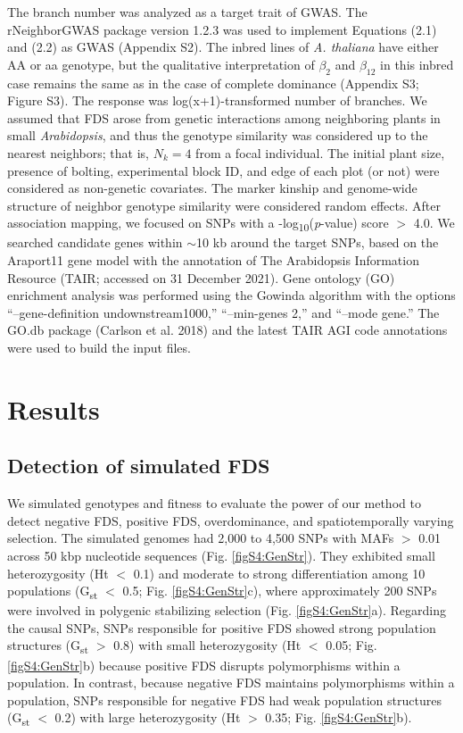 \documentclass[12pt,]{article}
\begin{document}
The branch number was analyzed as a target trait of GWAS. The rNeighborGWAS package version 1.2.3 \citep{sato2019neighbor} was used to implement Equations (2.1) and (2.2) as GWAS (Appendix S2). The inbred lines of \textit{A. thaliana} have either AA or aa genotype, but the qualitative interpretation of $\beta_2$ and $\beta_{12}$ in this inbred case remains the same as in the case of complete dominance (Appendix S3; Figure S3). The response was log(x+1)-transformed number of branches. We assumed that FDS arose from genetic interactions among neighboring plants in small \textit{Arabidopsis}, and thus the genotype similarity was considered up to the nearest neighbors; that is, $N_k=4$ from a focal individual. The initial plant size, presence of bolting, experimental block ID, and edge of each plot (or not) were considered as non-genetic covariates. The marker kinship and genome-wide structure of neighbor genotype similarity were considered random effects. After association mapping, we focused on SNPs with a -log\textsubscript{10}(\textit{p}-value) score $>$ 4.0. We searched candidate genes within $\sim$10 kb around the target SNPs, based on the Araport11 gene model with the annotation of The Arabidopsis Information Resource (TAIR; accessed on 31 December 2021). Gene ontology (GO) enrichment analysis was performed using the Gowinda algorithm \citep{kofler2012gowinda} with the options “--gene-definition undownstream1000,” “--min-genes 2,” and “--mode gene.” The GO.db package (Carlson et al. 2018) and the latest TAIR AGI code annotations were used to build the input files.


\section{Results}

\subsection{Detection of simulated FDS}
We simulated genotypes and fitness to evaluate the power of our method to detect negative FDS, positive FDS, overdominance, and spatiotemporally varying selection. The simulated genomes had 2,000 to 4,500 SNPs with MAFs $>$ 0.01 across 50 kbp nucleotide sequences (Fig. \ref{figS4:GenStr}). They exhibited small heterozygosity (Ht $<$ 0.1) and moderate to strong differentiation among 10 populations (G\textsubscript{st} $<$ 0.5; Fig. \ref{figS4:GenStr}c), where approximately 200 SNPs were involved in polygenic stabilizing selection (Fig. \ref{figS4:GenStr}a). Regarding the causal SNPs, SNPs responsible for positive FDS showed strong population structures (G\textsubscript{st} $>$ 0.8) with small heterozygosity (Ht $<$ 0.05; Fig. \ref{figS4:GenStr}b) because positive FDS disrupts polymorphisms within a population. In contrast, because negative FDS maintains polymorphisms within a population, SNPs responsible for negative FDS had weak population structures (G\textsubscript{st} $<$ 0.2) with large heterozygosity (Ht $>$ 0.35; Fig. \ref{figS4:GenStr}b).
\end{document}
